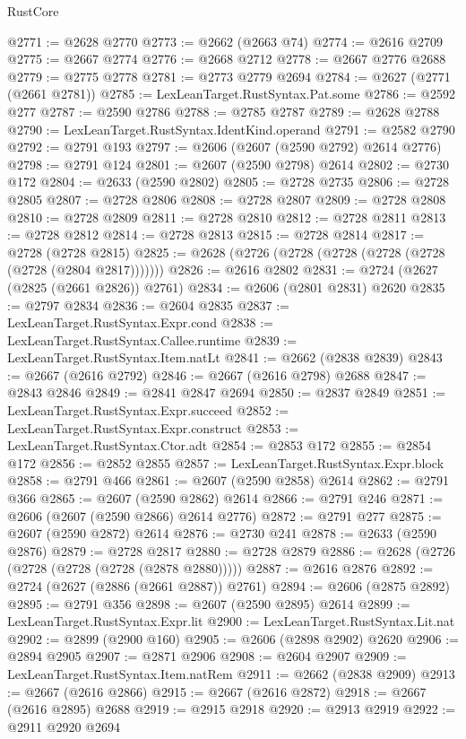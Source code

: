 \begin{lexlean}{RustCore}
\begin{coremodule}
@2771 := @2628 @2770
@2773 := @2662 (@2663 @74)
@2774 := @2616 @2709
@2775 := @2667 @2774
@2776 := @2668 @2712
@2778 := @2667 @2776 @2688
@2779 := @2775 @2778
@2781 := @2773 @2779 @2694
@2784 := @2627 (@2771 (@2661 @2781))
@2785 := LexLeanTarget.RustSyntax.Pat.some
@2786 := @2592 @277
@2787 := @2590 @2786
@2788 := @2785 @2787
@2789 := @2628 @2788
@2790 := LexLeanTarget.RustSyntax.IdentKind.operand
@2791 := @2582 @2790
@2792 := @2791 @193
@2797 := @2606 (@2607 (@2590 @2792) @2614 @2776)
@2798 := @2791 @124
@2801 := @2607 (@2590 @2798) @2614
@2802 := @2730 @172
@2804 := @2633 (@2590 @2802)
@2805 := @2728 @2735
@2806 := @2728 @2805
@2807 := @2728 @2806
@2808 := @2728 @2807
@2809 := @2728 @2808
@2810 := @2728 @2809
@2811 := @2728 @2810
@2812 := @2728 @2811
@2813 := @2728 @2812
@2814 := @2728 @2813
@2815 := @2728 @2814
@2817 := @2728 (@2728 @2815)
@2825 := @2628 (@2726 (@2728 (@2728 (@2728 (@2728 (@2728 (@2804 @2817)))))))
@2826 := @2616 @2802
@2831 := @2724 (@2627 (@2825 (@2661 @2826)) @2761)
@2834 := @2606 (@2801 @2831) @2620
@2835 := @2797 @2834
@2836 := @2604 @2835
@2837 := LexLeanTarget.RustSyntax.Expr.cond
@2838 := LexLeanTarget.RustSyntax.Callee.runtime
@2839 := LexLeanTarget.RustSyntax.Item.natLt
@2841 := @2662 (@2838 @2839)
@2843 := @2667 (@2616 @2792)
@2846 := @2667 (@2616 @2798) @2688
@2847 := @2843 @2846
@2849 := @2841 @2847 @2694
@2850 := @2837 @2849
@2851 := LexLeanTarget.RustSyntax.Expr.succeed
@2852 := LexLeanTarget.RustSyntax.Expr.construct
@2853 := LexLeanTarget.RustSyntax.Ctor.adt
@2854 := @2853 @172
@2855 := @2854 @172
@2856 := @2852 @2855
@2857 := LexLeanTarget.RustSyntax.Expr.block
@2858 := @2791 @466
@2861 := @2607 (@2590 @2858) @2614
@2862 := @2791 @366
@2865 := @2607 (@2590 @2862) @2614
@2866 := @2791 @246
@2871 := @2606 (@2607 (@2590 @2866) @2614 @2776)
@2872 := @2791 @277
@2875 := @2607 (@2590 @2872) @2614
@2876 := @2730 @241
@2878 := @2633 (@2590 @2876)
@2879 := @2728 @2817
@2880 := @2728 @2879
@2886 := @2628 (@2726 (@2728 (@2728 (@2728 (@2878 @2880)))))
@2887 := @2616 @2876
@2892 := @2724 (@2627 (@2886 (@2661 @2887)) @2761)
@2894 := @2606 (@2875 @2892)
@2895 := @2791 @356
@2898 := @2607 (@2590 @2895) @2614
@2899 := LexLeanTarget.RustSyntax.Expr.lit
@2900 := LexLeanTarget.RustSyntax.Lit.nat
@2902 := @2899 (@2900 @160)
@2905 := @2606 (@2898 @2902) @2620
@2906 := @2894 @2905
@2907 := @2871 @2906
@2908 := @2604 @2907
@2909 := LexLeanTarget.RustSyntax.Item.natRem
@2911 := @2662 (@2838 @2909)
@2913 := @2667 (@2616 @2866)
@2915 := @2667 (@2616 @2872)
@2918 := @2667 (@2616 @2895) @2688
@2919 := @2915 @2918
@2920 := @2913 @2919
@2922 := @2911 @2920 @2694

\end{coremodule}
\end{lexlean}
